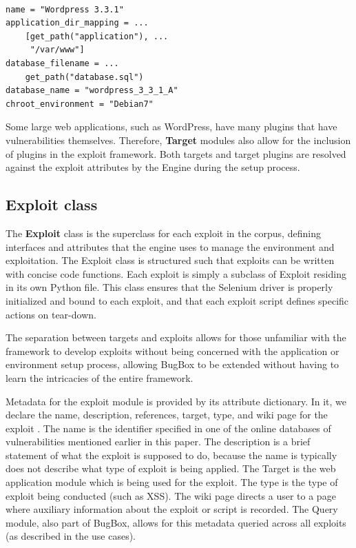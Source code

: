 \documentclass[letterpaper,twocolumn,10pt]{article}
\begin{document}
\begin{minipage}{\textwidth}
{\tt \footnotesize
\begin{lstlisting}
name = "Wordpress 3.3.1"
application_dir_mapping = ...
    [get_path("application"), ...
     "/var/www"]
database_filename = ...
    get_path("database.sql")
database_name = "wordpress_3_3_1_A"
chroot_environment = "Debian7"
\end{lstlisting}
} 
\end{minipage}


Some large web applications, such as WordPress, have many plugins that have vulnerabilities themselves. Therefore, {\bf Target} modules also allow for the inclusion of plugins in the exploit framework. Both targets and target plugins are resolved against the exploit attributes by the Engine during the setup process. 


\subsection{Exploit class}
The {\bf Exploit} class is the superclass for each exploit in the corpus, defining interfaces and attributes that the engine uses to manage the environment and exploitation. The Exploit class is structured such that exploits can be written with concise code functions. Each exploit is simply a subclass of Exploit residing in its own Python file. This class ensures that the Selenium driver is properly initialized and bound to each exploit, and that each exploit script defines specific actions on tear-down.

The separation between targets and exploits allows for those unfamiliar with the framework to develop exploits without being concerned with the application or environment setup process, allowing BugBox to be extended without having to learn the intricacies of the entire framework.\par
 
Metadata for the exploit module is provided by its attribute dictionary. In it, we declare the name, description, references, target, type, and wiki page for the exploit .  The name is the identifier specified in one of the online databases of vulnerabilities mentioned earlier in this paper.  The description is a brief statement of what the exploit is supposed to do, because the name is typically does not describe what type of exploit is being applied.  The Target is the web application module which is being used for the exploit. The type is the type of exploit being conducted (such as XSS). The wiki page directs a user to a page where auxiliary information about the exploit or script is recorded. The Query module, also part of BugBox, allows for this metadata queried across all exploits (as described in the use cases).
\end{document}
